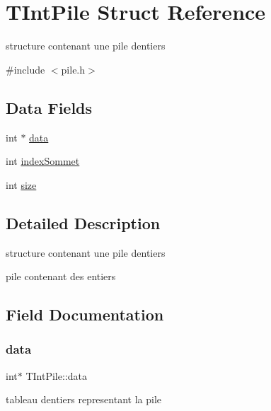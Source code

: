 \hypertarget{structTIntPile}{}\section{T\+Int\+Pile Struct Reference}
\label{structTIntPile}


structure contenant une pile d\textquotesingle{}entiers  




{\ttfamily \#include $<$pile.\+h$>$}

\subsection*{Data Fields}
\begin{DoxyCompactItemize}
\item 
int $\ast$ \hyperlink{structTIntPile_a35035a280ee323ce10d5b5186cf85885}{data}
\item 
int \hyperlink{structTIntPile_abc42e6db26a0f0a8faec95c5f0326a1f}{index\+Sommet}
\item 
int \hyperlink{structTIntPile_a69b5112feaa16a029b4a86ec1130dec2}{size}
\end{DoxyCompactItemize}


\subsection{Detailed Description}
structure contenant une pile d\textquotesingle{}entiers 

pile contenant des entiers 

\subsection{Field Documentation}
\mbox{\label{structTIntPile_a35035a280ee323ce10d5b5186cf85885}} 
\subsubsection{\texorpdfstring{data}{data}}
{\footnotesize\ttfamily int$\ast$ T\+Int\+Pile\+::data}

tableau d\textquotesingle{}entiers representant la pile \mbox{\label{structTIntPile_abc42e6db26a0f0a8faec95c5f0326a1f}} 
